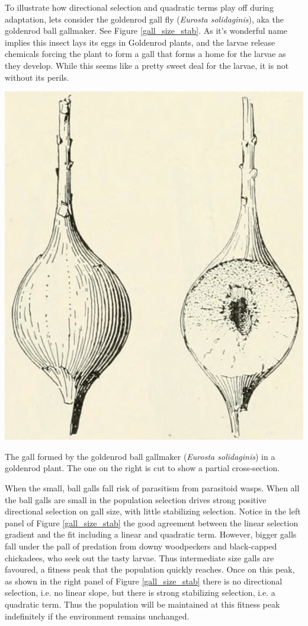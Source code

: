 To illustrate how directional selection and quadratic terms play off
during adaptation, lets consider the goldenrod gall fly ({\it Eurosta solidaginis}), aka the goldenrod
ball gallmaker. See Figure \ref{gall_size_stab}. As it's wonderful name
implies this insect lays its eggs in Goldenrod plants, and the larvae
release chemicals forcing the plant to form a gall that forms a home
for the larvae as they develop. While this seems like a pretty sweet
deal for the larvae, it is not without its perils. \begin{marginfigure}[2cm]
\begin{center}
\includegraphics[width= 0.7 \textwidth]{illustration_images/Quant_gen/goldenrod_ball_gall_maker/goldenrod_ball_gall_maker.png}
\end{center}
\caption{The gall formed by the goldenrod
ball gallmaker ({\it Eurosta solidaginis}) in a goldenrod plant. The
one on the right is cut to show a partial cross-section.  }  
\end{marginfigure}
When the small, ball galls fall risk of parasitism from parasitoid
wasps. When all the ball galls are small in the population selection drives strong positive directional selection on
gall size, with little stabilizing selection. Notice in the left panel
of Figure \ref{gall_size_stab} the good
agreement between the linear selection gradient and the fit including
a linear and quadratic term. However, bigger galls fall under the pall of predation from downy
woodpeckers and black-capped chickadees, who seek out the tasty
larvae. Thus intermediate size galls are favoured, a fitness peak that
the population quickly reaches. Once on this peak,
as shown in the right panel of Figure \ref{gall_size_stab} there is no directional selection, i.e. no linear slope, but there
is strong stabilizing selection, i.e. a quadratic term. Thus the
population will be maintained at this fitness peak indefinitely if the
environment remains unchanged.

